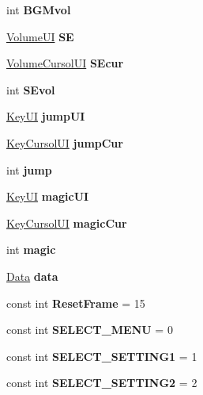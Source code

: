 \begin{DoxyCompactItemize}
int {\bfseries B\+G\+Mvol}
\item 
\mbox{\label{class_config_a565485ce386fe631bd8c63b66501d3d8}} 
\hyperlink{class_volume_u_i}{Volume\+UI} {\bfseries SE}
\item 
\mbox{\label{class_config_a5a703731c0d005406aa08d078bc19a4c}} 
\hyperlink{class_volume_cursol_u_i}{Volume\+Cursol\+UI} {\bfseries S\+Ecur}
\item 
\mbox{\label{class_config_ada8ed8c84a07db55553002242c05edf8}} 
int {\bfseries S\+Evol}
\item 
\mbox{\label{class_config_add25d64ad8c40a5f169eaddc2e57696b}} 
\hyperlink{class_key_u_i}{Key\+UI} {\bfseries jump\+UI}
\item 
\mbox{\label{class_config_a53c24d69f66cb6feeea93596285708a6}} 
\hyperlink{class_key_cursol_u_i}{Key\+Cursol\+UI} {\bfseries jump\+Cur}
\item 
\mbox{\label{class_config_a0ba228792c507b5c2fee787cde055316}} 
int {\bfseries jump}
\item 
\mbox{\label{class_config_ad9790c8ca3ab5e8358fd509dcfb1c4eb}} 
\hyperlink{class_key_u_i}{Key\+UI} {\bfseries magic\+UI}
\item 
\mbox{\label{class_config_ad425f69b6aa72c1144739d012a2c6fc1}} 
\hyperlink{class_key_cursol_u_i}{Key\+Cursol\+UI} {\bfseries magic\+Cur}
\item 
\mbox{\label{class_config_a9ed40371e3e12646f3a87a9e66b21938}} 
int {\bfseries magic}
\item 
\mbox{\label{class_config_a128844019d9db9782d6a0f69e3a0333e}} 
\hyperlink{class_data}{Data} {\bfseries data}
\item 
\mbox{\label{class_config_a3be9af991b5a6e9feb130ca13961bb52}} 
const int {\bfseries Reset\+Frame} = 15
\item 
\mbox{\label{class_config_aa8e0074c0d65d8898b5d0d5db9caef91}} 
const int {\bfseries S\+E\+L\+E\+C\+T\+\_\+\+M\+E\+NU} = 0
\item 
\mbox{\label{class_config_accdc1e21859714e523973720a8292176}} 
const int {\bfseries S\+E\+L\+E\+C\+T\+\_\+\+S\+E\+T\+T\+I\+N\+G1} = 1
\item 
\mbox{\label{class_config_a1e71700908a27cc3f4157c0c33e1764d}} 
const int {\bfseries S\+E\+L\+E\+C\+T\+\_\+\+S\+E\+T\+T\+I\+N\+G2} = 2
\end{DoxyCompactItemize}


